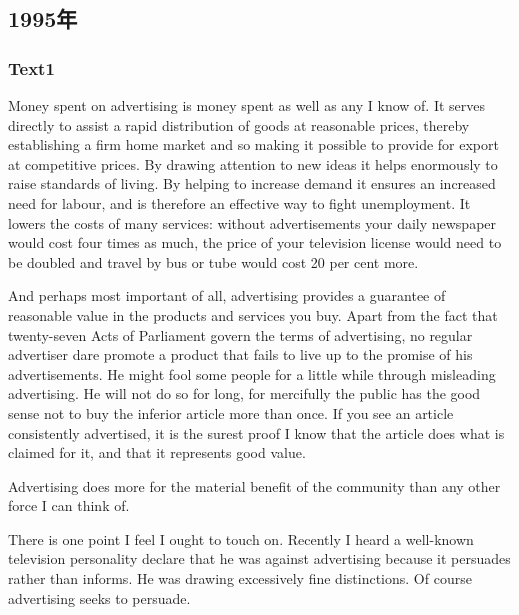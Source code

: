\documentclass[a4paper]{article}
\begin{document}
\subsection{1995年}
\subsubsection{Text1}

\par
Money spent on advertising is money spent as well as any I know of. It serves directly to assist a rapid distribution of goods at reasonable prices, thereby establishing a firm home market and so making it possible to provide for export at competitive prices. By drawing attention to new ideas it helps enormously to raise standards of living. By helping to increase demand it ensures an increased need for labour, and is therefore an effective way to fight unemployment. It lowers the costs of many services: without advertisements your daily newspaper would cost four times as much, the price of your television license would need to be doubled and travel by bus or tube would cost 20 per cent more.

\par
And perhaps most important of all, advertising provides a guarantee of reasonable value in the products and services you buy. Apart from the fact that twenty-seven Acts of Parliament govern the terms of advertising, no regular advertiser dare promote a product that fails to live up to the promise of his advertisements. He might fool some people for a little while through misleading advertising. He will not do so for long, for mercifully the public has the good sense not to buy the inferior article more than once. If you see an article consistently advertised, it is the surest proof I know that the article does what is claimed for it, and that it represents good value.

\par
Advertising does more for the material benefit of the community than any other force I can think of.

\par
There is one point I feel I ought to touch on. Recently I heard a well-known television personality declare that he was against advertising because it persuades rather than informs. He was drawing excessively fine distinctions. Of course advertising seeks to persuade.
\end{document}
